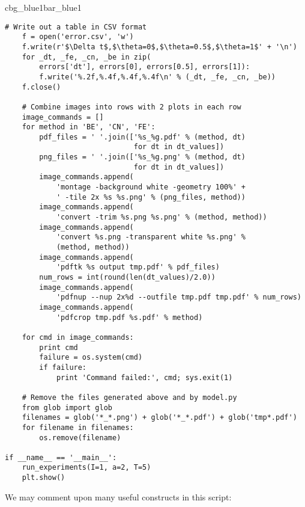 \documentclass[graybox,sectrefs,envcountresetchap,open=right,final]{svmonodo}
\newenvironment{_pro_tight}[2]{
   \def\FrameCommand{\color{#2}\vrule width 1mm\normalcolor\colorbox{#1}}
   \FrameRule0.6pt\MakeFramed {\advance\hsize-2mm\FrameRestore}\vskip3mm}
   {\vskip0mm\endMakeFramed}
\newenvironment{pro}[2]{
\bgroup\rmfamily
\fboxsep=0mm\relax
\begin{_pro_tight}{#1}{#2}
\list{}{\parsep=-2mm\parskip=0mm\topsep=0pt\leftmargin=2mm
\rightmargin=2\leftmargin\leftmargin=4pt\relax}
\item\relax}
{\endlist\end{_pro_tight}\egroup}
\begin{document}
\begin{pro}{cbg_blue1}{bar_blue1}
\begin{Verbatim}[numbers=none,fontsize=\fontsize{9pt}{9pt},baselinestretch=0.95,xleftmargin=2mm]
    # Write out a table in CSV format
    f = open('error.csv', 'w')
    f.write(r'$\Delta t$,$\theta=0$,$\theta=0.5$,$\theta=1$' + '\n')
    for _dt, _fe, _cn, _be in zip(
        errors['dt'], errors[0], errors[0.5], errors[1]):
        f.write('%.2f,%.4f,%.4f,%.4f\n' % (_dt, _fe, _cn, _be))
    f.close()

    # Combine images into rows with 2 plots in each row
    image_commands = []
    for method in 'BE', 'CN', 'FE':
        pdf_files = ' '.join(['%s_%g.pdf' % (method, dt)
                              for dt in dt_values])
        png_files = ' '.join(['%s_%g.png' % (method, dt)
                              for dt in dt_values])
        image_commands.append(
            'montage -background white -geometry 100%' +
            ' -tile 2x %s %s.png' % (png_files, method))
        image_commands.append(
            'convert -trim %s.png %s.png' % (method, method))
        image_commands.append(
            'convert %s.png -transparent white %s.png' %
            (method, method))
        image_commands.append(
            'pdftk %s output tmp.pdf' % pdf_files)
        num_rows = int(round(len(dt_values)/2.0))
        image_commands.append(
            'pdfnup --nup 2x%d --outfile tmp.pdf tmp.pdf' % num_rows)
        image_commands.append(
            'pdfcrop tmp.pdf %s.pdf' % method)

    for cmd in image_commands:
        print cmd
        failure = os.system(cmd)
        if failure:
            print 'Command failed:', cmd; sys.exit(1)

    # Remove the files generated above and by model.py
    from glob import glob
    filenames = glob('*_*.png') + glob('*_*.pdf') + glob('tmp*.pdf')
    for filename in filenames:
        os.remove(filename)

if __name__ == '__main__':
    run_experiments(I=1, a=2, T=5)
    plt.show()
\end{Verbatim}
\end{pro}
\noindent

 

We may comment upon many useful constructs in this script:
\end{document}
